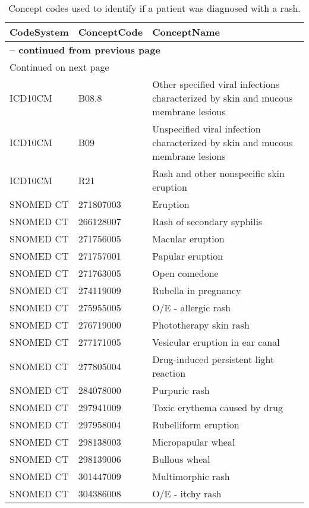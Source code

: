 \begin{longtable}{p{}p{}p{}}
\caption{Concept codes used to identify if a patient was diagnosed with a rash.} \\ 
 CodeSystem & ConceptCode & ConceptName \\ 
  \hline 
\endfirsthead 
\multicolumn{3}{p{\textwidth}}{{ \bfseries \tablename \thetable{} -- continued from previous page}} \ 
\hline CodeSystem & ConceptCode & ConceptName \\ \hline 
\endhead 
\hline \multicolumn{3}{p{\textwidth}}{{Continued on next page}} \\ \hline 
\endfoot 
\hline 
\endlastfoot 
 \hline
ICD10CM & B08.8 & Other specified viral infections characterized by skin and mucous membrane lesions \\ 
  ICD10CM & B09 & Unspecified viral infection characterized by skin and mucous membrane lesions \\ 
  ICD10CM & R21 & Rash and other nonspecific skin eruption \\ 
  SNOMED CT & 271807003 & Eruption \\ 
  SNOMED CT & 266128007 & Rash of secondary syphilis \\ 
  SNOMED CT & 271756005 & Macular eruption \\ 
  SNOMED CT & 271757001 & Papular eruption \\ 
  SNOMED CT & 271763005 & Open comedone \\ 
  SNOMED CT & 274119009 & Rubella in pregnancy \\ 
  SNOMED CT & 275955005 & O/E - allergic rash \\ 
  SNOMED CT & 276719000 & Phototherapy skin rash \\ 
  SNOMED CT & 277171005 & Vesicular eruption in ear canal \\ 
  SNOMED CT & 277805004 & Drug-induced persistent light reaction \\ 
  SNOMED CT & 284078000 & Purpuric rash \\ 
  SNOMED CT & 297941009 & Toxic erythema caused by drug \\ 
  SNOMED CT & 297958004 & Rubelliform eruption \\ 
  SNOMED CT & 298138003 & Micropapular wheal \\ 
  SNOMED CT & 298139006 & Bullous wheal \\ 
  SNOMED CT & 301447009 & Multimorphic rash \\ 
  SNOMED CT & 304386008 & O/E - itchy rash \\ 

\end{longtable}
